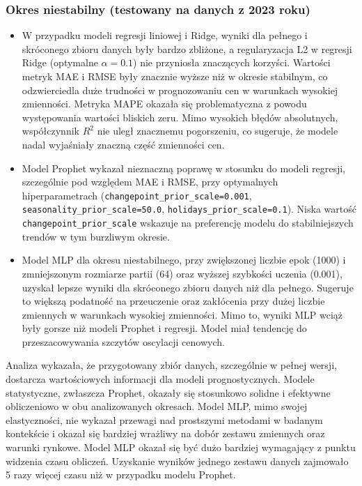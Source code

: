 \subsubsection{Okres niestabilny (testowany na danych z 2023 roku)}
\begin{itemize}
    \item W przypadku modeli regresji liniowej i Ridge, wyniki dla pełnego i skróconego zbioru danych były bardzo zbliżone, a regularyzacja L2 w regresji Ridge (optymalne $\alpha = 0.1$) nie przyniosła znaczących korzyści. Wartości metryk MAE i RMSE były znacznie wyższe niż w okresie stabilnym, co odzwierciedla duże trudności w prognozowaniu cen w warunkach wysokiej zmienności. Metryka MAPE okazała się problematyczna z powodu występowania wartości bliskich zeru. Mimo wysokich błędów absolutnych, współczynnik $R^2$ nie uległ znacznemu pogorszeniu, co sugeruje, że modele nadal wyjaśniały znaczną część zmienności cen.
    \item Model Prophet wykazał nieznaczną poprawę w stosunku do modeli regresji, szczególnie pod względem MAE i RMSE, przy optymalnych hiperparametrach (\texttt{changepoint\_prior\_scale=0.001}, \texttt{seasonality\_prior\_scale=50.0}, \texttt{holidays\_prior\_scale=0.1}). Niska wartość \texttt{changepoint\_prior\_scale} wskazuje na preferencję modelu do stabilniejszych trendów w tym burzliwym okresie.
    \item Model MLP dla okresu niestabilnego, przy zwiększonej liczbie epok (1000) i zmniejszonym rozmiarze partii (64) oraz wyższej szybkości uczenia (0.001), uzyskał lepsze wyniki dla skróconego zbioru danych niż dla pełnego. Sugeruje to większą podatność na przeuczenie oraz zakłócenia przy dużej liczbie zmiennych w warunkach wysokiej zmienności. Mimo to, wyniki MLP wciąż były gorsze niż modeli Prophet i regresji. Model miał tendencję do przeszacowywania szczytów oscylacji cenowych.
\end{itemize}

Analiza wykazała, że przygotowany zbiór danych, szczególnie w pełnej wersji, dostarcza wartościowych informacji dla modeli prognostycznych. Modele statystyczne, zwłaszcza Prophet, okazały się stosunkowo solidne i efektywne obliczeniowo w obu analizowanych okresach. Model MLP, mimo swojej elastyczności, nie wykazał przewagi nad prostszymi metodami w badanym kontekście i okazał się bardziej wrażliwy na dobór zestawu zmiennych oraz warunki rynkowe. Model MLP okazał się być dużo bardziej wymagający z punktu widzenia czasu obliczeń. Uzyskanie wyników jednego zestawu danych zajmowało 5 razy więcej czasu niż w przypadku modelu Prophet.

